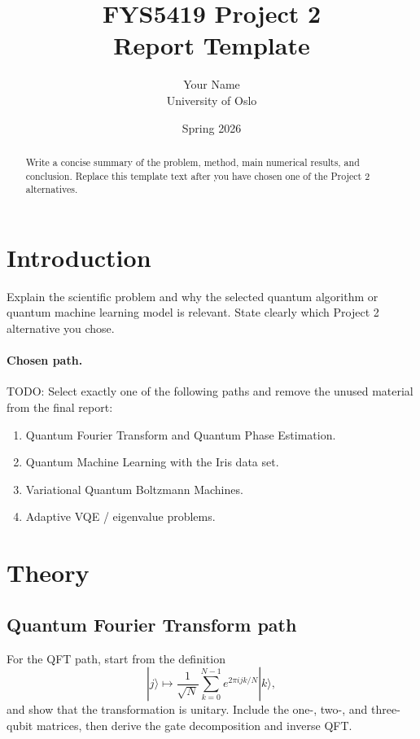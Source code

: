 \documentclass[11pt,a4paper]{article}
\title{FYS5419 Project 2\\\large Report Template}
\author{Your Name\\University of Oslo}
\date{Spring 2026}
\begin{document}
\maketitle

\begin{abstract}
Write a concise summary of the problem, method, main numerical results, and conclusion. Replace this template text after you have chosen one of the Project 2 alternatives.
\end{abstract}

\tableofcontents
\newpage

\section{Introduction}
Explain the scientific problem and why the selected quantum algorithm or quantum machine learning model is relevant. State clearly which Project 2 alternative you chose.

\paragraph{Chosen path.} TODO: Select exactly one of the following paths and remove the unused material from the final report:
\begin{enumerate}
    \item Quantum Fourier Transform and Quantum Phase Estimation.
    \item Quantum Machine Learning with the Iris data set.
    \item Variational Quantum Boltzmann Machines.
    \item Adaptive VQE / eigenvalue problems.
\end{enumerate}

\section{Theory}

\subsection{Quantum Fourier Transform path}
For the QFT path, start from the definition
\begin{equation}
    |j\rangle \mapsto \frac{1}{\sqrt{N}}\sum_{k=0}^{N-1} e^{2\pi i j k/N}|k\rangle,
\end{equation}
and show that the transformation is unitary. Include the one-, two-, and three-qubit matrices, then derive the gate decomposition and inverse QFT.
\end{document}
